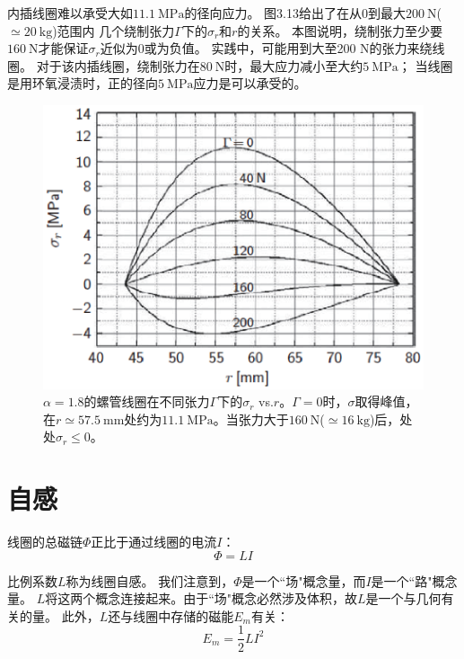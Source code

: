 内插线圈难以承受大如$11.1\ \mathrm{MPa}$的径向应力。
图3.13给出了在从0到最大$200\ \mathrm{N}$($\simeq 20\ \mathrm{kg}$)范围内
几个绕制张力$\Gamma$下的$\sigma_{r}$和$r$的关系。
本图说明，绕制张力至少要$160\ \mathrm{N}$才能保证$\sigma_{r}$近似为0或为负值。
实践中，可能用到大至200 N的张力来绕线圈。
对于该内插线圈，绕制张力在$80\ \mathrm{N}$时，最大应力减小至大约$5\ \mathrm{MPa}$；
当线圈是用环氧浸渍时，正的径向$5\ \mathrm{MPa}$应力是可以承受的。
\begin{figure}[htbp]
  \centering
 \includegraphics[scale=0.7]{chpt3/figs/fig3.13.eps}
  \caption{$\alpha=1.8$的螺管线圈在不同张力$\Gamma$下的$\sigma_r$ vs.$r$。$\Gamma=0$时，$\sigma$取得峰值，在$r\simeq 57.5\ \mathrm{mm}$处约为$11.1\ \mathrm{MPa}$。当张力大于$160\ \mathrm{N}$($\simeq 16\ \mathrm{kg}$)后，处处$\sigma_r\le 0 $。}
\end{figure}





\section{自感}
线圈的总磁链$\Phi$正比于通过线圈的电流$I$：
\begin{equation}
 \Phi=LI %
\end{equation}

比例系数$L$称为线圈自感。
我们注意到，$\Phi$是一个``场"概念量，而$I$是一个``路"概念量。
$L$将这两个概念连接起来。由于``场"概念必然涉及体积，故$L$是一个与几何有关的量。
此外，$L$还与线圈中存储的磁能$E_m$有关：
\begin{equation}
 E_m=\frac{1}{2}LI^2 %
\end{equation}


